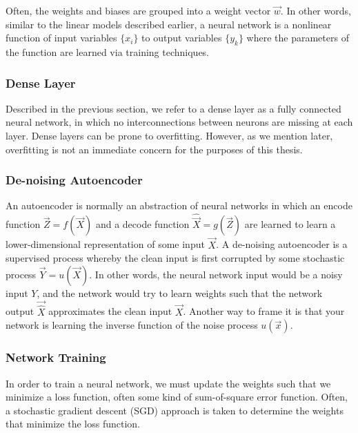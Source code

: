 Often, the weights and biases are grouped into a weight vector $\vec{w}$. In other words, similar to the linear models described earlier, a neural network is a nonlinear function of input variables $\{x_i\}$ to output variables $\{y_k\}$ where the parameters of the function are learned via training techniques.

\subsubsection{Dense Layer}

Described in the previous section, we refer to a dense layer as a fully connected neural network, in which no interconnections between neurons are missing at each layer. Dense layers can be prone to overfitting. However, as we mention later, overfitting is not an immediate concern for the purposes of this thesis.

\subsubsection{De-noising Autoencoder}

An autoencoder is normally an abstraction of neural networks in which an encode function $\vec{Z}=f(\vec{X})$ and a decode function $\hat{\vec{X}}=g(\vec{Z})$ are learned to learn a lower-dimensional representation of some input $\vec{X}$. \cite{stow} A de-noising autoencoder is a supervised process whereby the clean input is first corrupted by some stochastic process $\vec{Y}=u(\vec{X})$. In other words, the neural network input would be a noisy input $Y$, and the network would try to learn weights such that the network output $\vec{\hat{X}}$ approximates the clean input $\vec{X}$. Another way to frame it is that your network is learning the inverse function of the noise process $u(\vec{x})$.




\subsubsection{Network Training}

In order to train a neural network, we must update the weights such that we minimize a loss function, often some kind of sum-of-square error function. \cite{bishop} Often, a stochastic gradient descent (SGD) approach is taken to determine the weights that minimize the loss function.



